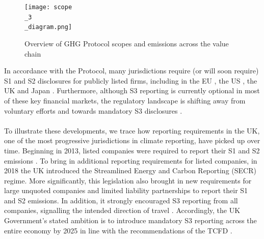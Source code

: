 \documentclass[12pt,twoside]{report}
\newcommand\fnote[1]{\captionsetup{font=small, justification=raggedright, singlelinecheck=false}\subcaption*{\textit{#1}}}
\begin{document}
\begin{figure}[H]
	\centering
	\caption{Overview of GHG Protocol scopes and emissions across the value chain}
	\label{fig:Scope3Diagram}
	\texttt{[image: scope\\\_3\\\_diagram.png]}
	\fnote{Source: \cite{ghgscope32013}, p.6}
\end{figure}

In accordance with the Protocol, many jurisdictions require (or will soon require) S1 and S2 disclosures for publicly listed firms, including in the EU \cite{eu20232772}, the US \cite{sec2024}, the UK \cite{ukleg2013} and Japan \cite{fsa2022}. Furthermore, although S3 reporting is currently optional in most of these key financial markets, the regulatory landscape is shifting away from voluntary efforts and towards mandatory S3 disclosures \cite{ftserussell2024}. 
\\ \\
To illustrate these developments, we trace how reporting requirements in the UK, one of the most progressive jurisdictions in climate reporting, have picked up over time. Beginning in 2013, listed companies were required to report their S1 and S2 emissions \cite{ukleg2013}. To bring in additional reporting requirements for listed companies, in 2018 the UK introduced the Streamlined Energy and Carbon Reporting (SECR) regime. More significantly, this legislation also brought in new requirements for large unquoted companies and limited liability partnerships to report their S1 and S2 emissions. In addition, it strongly encouraged S3 reporting from all companies, signalling the intended direction of travel \cite{UKSECRGuidance2019}. Accordingly, the UK Government's stated ambition is to introduce mandatory S3 reporting across the entire economy by 2025 in line with the recommendations of the TCFD \cite{ukgov2020}. 
\end{document}
